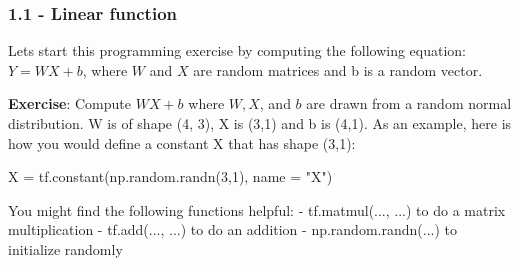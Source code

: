 \documentclass[11pt]{article}
\newenvironment{Shaded}{}{}
\newcommand{\DecValTok}[1]{\textcolor[rgb]{0.25,0.63,0.44}{{#1}}}
\newcommand{\StringTok}[1]{\textcolor[rgb]{0.25,0.44,0.63}{{#1}}}
\newcommand{\NormalTok}[1]{{#1}}
\newcommand{\OperatorTok}[1]{\textcolor[rgb]{0.40,0.40,0.40}{{#1}}}
\begin{document}
    \subsubsection{1.1 - Linear function}\label{linear-function}

Lets start this programming exercise by computing the following
equation: \(Y = WX + b\), where \(W\) and \(X\) are random matrices and
b is a random vector.

\textbf{Exercise}: Compute \(WX + b\) where \(W, X\), and \(b\) are
drawn from a random normal distribution. W is of shape (4, 3), X is
(3,1) and b is (4,1). As an example, here is how you would define a
constant X that has shape (3,1):

\begin{Shaded}
\begin{Highlighting}[]
\NormalTok{X }\OperatorTok{=}\NormalTok{ tf.constant(np.random.randn(}\DecValTok{3}\NormalTok{,}\DecValTok{1}\NormalTok{), name }\OperatorTok{=} \StringTok{"X"}\NormalTok{)}
\end{Highlighting}
\end{Shaded}

You might find the following functions helpful: - tf.matmul(..., ...) to
do a matrix multiplication - tf.add(..., ...) to do an addition -
np.random.randn(...) to initialize randomly
\end{document}
